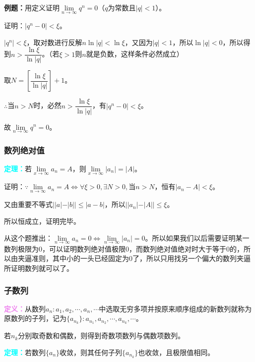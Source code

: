 \documentclass[UTF8, 12pt]{ctexart}
\begin{document}
        \textbf{例题：}用定义证明$\lim\limits_{n\to\infty}q^n=0$（$q$为常数且$\vert q\vert<1$）。

        证明：$\vert q^n-0\vert<\xi$。

        $\vert q^n\vert<\xi$，取对数进行反解$n\ln\vert q\vert<\ln\xi$，又因为$\vert q\vert<1$，所以$\ln\vert q\vert<0$，所以得到$n>\dfrac{\ln\xi}{\ln\vert q\vert}$。（若$\xi>1$则$n$就是负数，这样条件必然成立）

        取$N=\left[\dfrac{\ln\xi}{\ln\vert q\vert}\right]+1$。

        $\therefore$当$n>N$时，必然$n>\dfrac{\ln\xi}{\ln\vert q\vert}$，有$\vert q^n-0\vert<\xi$。

        故$\lim\limits_{n\to\infty}q^n=0$。

        \subsubsection{数列绝对值}

        \textcolor{aqua}{\textbf{定理：}}若$\lim\limits_{x\to\infty}a_n=A$，则$\lim\limits_{x\to\infty}\vert a_n\vert=\vert A\vert$。

        证明：$\because\lim\limits_{n\to\infty}a_n=A\Leftrightarrow\forall\xi>0,\exists N>0,\text{当}n>N$，恒有$\vert a_n-A\vert<\xi$。

        又由重要不等式$\vert\vert a\vert-\vert b\vert\vert\leqslant\vert a-b\vert$，所以$\vert\vert a_n\vert-\vert A\vert\vert\leqslant\xi$。

        所以恒成立，证明完毕。

        从这个题推出：$\lim\limits_{n\to\infty}a_n=0\Leftrightarrow\lim\limits_{n\to\infty}\vert a_n\vert=0$。所以如果我们以后需要证明某一数列极限为0，可以证明数列绝对值极限0，而数列绝对值绝对时大于等于0的，所以由夹逼准则，其中小的一头已经固定为0了，所以只用找另一个偏大的数列夹逼所证明数列就可以了。

        \subsubsection{子数列}

        \textcolor{violet}{\textbf{定义：}}从数列${a_n}:a_1,a_2,\cdots,a_n,\cdots$中选取无穷多项并按原来顺序组成的新数列就称为原数列的子列，记为$\{a_{n_k}\}:a_{n_1},a_{n_2},\cdots,a_{n_k},\cdots$。

        若$n_k$分别取奇数和偶数，则得到奇数项数列与偶数项数列。

        \textcolor{aqua}{\textbf{定理：}}若数列$\{a_n\}$收敛，则其任何子列$\{a_{n_k}\}$也收敛，且极限值相同。
\end{document}
